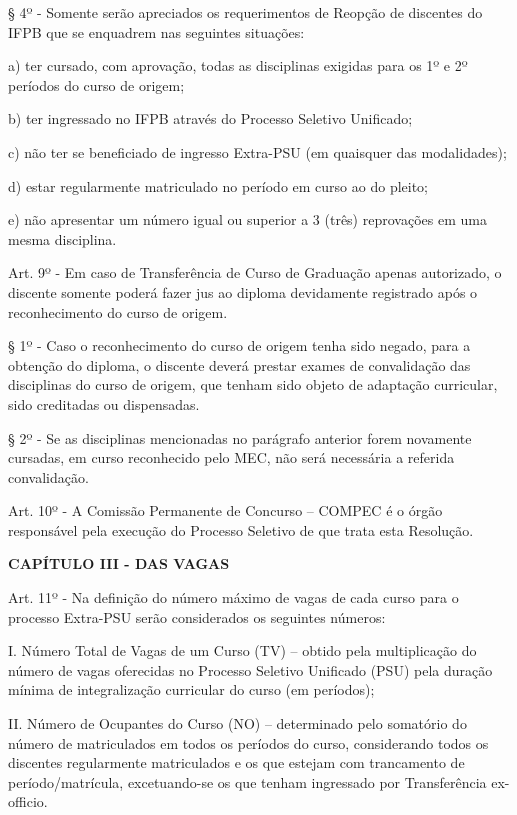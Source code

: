 	§ 4º - Somente serão apreciados os requerimentos de Reopção de discentes do IFPB que se enquadrem nas seguintes situações:

	a) ter cursado, com aprovação, todas as disciplinas exigidas para os 1º e 2º períodos do curso de origem;

	b) ter ingressado no IFPB através do Processo Seletivo Unificado;

	c) não ter se beneficiado de ingresso Extra-PSU (em quaisquer das modalidades);

	d) estar regularmente matriculado no período em curso ao do pleito;

	e) não apresentar um número igual ou superior a 3 (três) reprovações em uma mesma disciplina.

\vspace{1mm}
Art. 9º - Em caso de Transferência de Curso de Graduação apenas autorizado, o discente somente poderá fazer jus ao diploma devidamente registrado após o reconhecimento do curso de origem.

§ 1º - Caso o reconhecimento do curso de origem tenha sido negado, para a obtenção do diploma, o discente deverá prestar exames de convalidação das disciplinas do curso de origem, que tenham sido objeto de adaptação curricular, sido creditadas ou dispensadas.

§ 2º - Se as disciplinas mencionadas no parágrafo anterior forem novamente cursadas, em curso reconhecido pelo MEC, não será necessária a referida convalidação.

\vspace{1mm}
Art. 10º - A Comissão Permanente de Concurso – COMPEC é o órgão responsável pela execução do Processo Seletivo de que trata esta Resolução.


\vspace{4mm}
\textbf{CAPÍTULO III - DAS VAGAS}
\vspace{4mm}


\vspace{1mm}
Art. 11º - Na definição do número máximo de vagas de cada curso para o processo Extra-PSU serão considerados os seguintes números:


I. Número Total de Vagas de um Curso (TV) – obtido pela multiplicação do número de vagas oferecidas no Processo Seletivo Unificado (PSU) pela duração mínima de integralização curricular do curso (em períodos);

II. Número de Ocupantes do Curso (NO) – determinado pelo somatório do número de matriculados em todos os períodos do curso, considerando todos os discentes regularmente matriculados e os que estejam com trancamento de período/matrícula, excetuando-se os que tenham ingressado por Transferência ex-officio.

